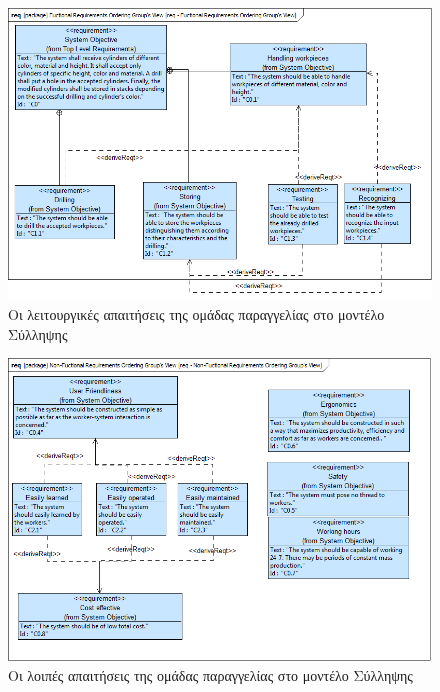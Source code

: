 \documentclass[a4paper,12pt,twoside]{report}
\begin{document}
\begin{appendices}
				\begin{figure}[hp]
					\centering
					\includegraphics[scale=0.45]{ConceptionalModel_req-FuctionalRequirementsOrderingGroupsView.png}
					\caption{Οι λειτουργικές απαιτήσεις της ομάδας παραγγελίας στο μοντέλο Σύλληψης}
					\label{φωτ:Οι λειτουργικές απαιτήσεις της ομάδας παραγγελίας στο μοντέλο Σύλληψης}
				\end{figure}
				
				\begin{figure}[hp]
					\centering
					\includegraphics[scale=0.45]{ConceptionalModel_req-Non-FuctionalRequirementsOrderingGroupsView.png}
					\caption{Οι λοιπές απαιτήσεις της ομάδας παραγγελίας στο μοντέλο Σύλληψης}
					\label{φωτ:Οι λοιπές απαιτήσεις της ομάδας παραγγελίας στο μοντέλο Σύλληψης}
				\end{figure}
				

\end{appendices}
\end{document}
